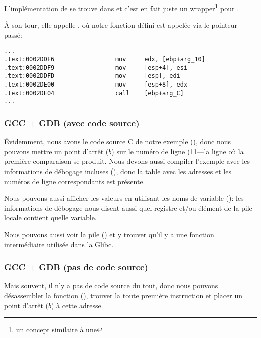 
L'implémentation de \qsort se trouve dans  et c'est en fait juste un
wrapper\footnote{un concept similaire à une }
pour .

À son tour, elle appelle , où notre fonction défini est appelée via
le pointeur passé:

\begin{lstlisting}[caption=(fihier libc.so.6{,} glibc version---2.10.1),style=customasmx86]
...
.text:0002DDF6                 mov     edx, [ebp+arg_10]
.text:0002DDF9                 mov     [esp+4], esi
.text:0002DDFD                 mov     [esp], edi
.text:0002DE00                 mov     [esp+8], edx
.text:0002DE04                 call    [ebp+arg_C]
...
\end{lstlisting}

\subsubsection{GCC + GDB (avec code source)}

Évidemment, nous avons le code source C de notre exemple (), donc
nous pouvons mettre un point d'arrêt ($b$) sur le numéro de ligne (11---la ligne
où la première comparaison se produit.
Nous devons aussi compiler l'exemple avec les informations de débogage incluses (),
donc la table avec les adresses et les numéros de ligne correspondants est présente.

Nous pouvons aussi afficher les valeurs en utilisant les noms de variable ():
les informations de débogage nous disent aussi quel registre et/ou élément de la
pile locale contient quelle variable.

Nous pouvons aussi voir la pile () et y trouver qu'il y a une fonction intermédiaire
 utilisée dans la Glibc.



\subsubsection{GCC + GDB (pas de code source)}

Mais souvent, il n'y a pas de code source du tout, donc nous pouvons désassembler
la fonction \comp (), trouver la toute première instruction \CMP et placer
un point d'arrêt ($b$) à cette adresse.

